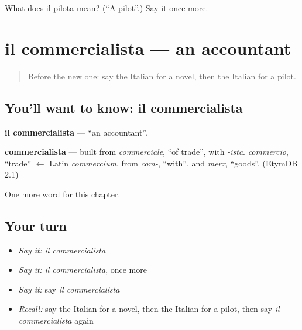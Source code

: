 \begin{tcolorbox}[breakable,colback=teal!4,colframe=teal!35!black,title={Before you move on}]
What does il pilota mean? (\textquotedblleft{}A pilot\textquotedblright{}.) Say it once more.
\end{tcolorbox}
\section[il commercialista]{il commercialista — an accountant}

\label{lesson:IT-C195-commercialista}



\begin{quote}
Before the new one: say the Italian for a novel, then the Italian for a pilot.
\end{quote}

\subsection*{You'll want to know: il commercialista}
\textbf{il commercialista} — \textquotedblleft{}an accountant\textquotedblright{}.

\begin{cousinweb}
\textbf{commercialista} — built from \emph{commerciale}, \textquotedblleft{}of trade\textquotedblright{}, with \emph{-ista}. \emph{commercio}, \textquotedblleft{}trade\textquotedblright{} $\leftarrow$ Latin \emph{commercium}, from \emph{com-}, \textquotedblleft{}with\textquotedblright{}, and \emph{merx}, \textquotedblleft{}goods\textquotedblright{}. (EtymDB 2.1)
\end{cousinweb}

\begin{grammarlens}[title={What you've built}]
One more word for this chapter.
\end{grammarlens}

\subsection*{Your turn}
\begin{itemize}
\raggedright
  \item \emph{Say it:} \emph{il commercialista}
  \item \emph{Say it:} \emph{il commercialista}, once more
  \item \emph{Say it:} say \emph{il commercialista}
  \item \emph{Recall:} say the Italian for a novel, then the Italian for a pilot, then say \emph{il commercialista} again
\end{itemize}


